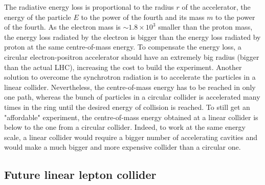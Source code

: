     The radiative energy loss is proportional to the radius $r$ of the accelerator, the energy of the particle $E$ to the power of the fourth and its mass $m$ to the power of the fourth.
    As the electron mass is $\sim 1.8 \times 10^3$ smaller than the proton mass, the energy loss radiated by the electron is bigger than the energy loss radiated by proton at the same centre-of-mass energy.
    To compensate the energy loss, a circular electron-positron accelerator should have an extremely big radius (bigger than the actual \gls{LHC}), increasing the cost to build the experiment.
    Another solution to overcome the synchrotron radiation is to accelerate the particles in a linear collider. Nevertheless, the centre-of-mass energy has to be reached in only one path, whereas the bunch of particles in a circular collider is accelerated many times in the ring until the desired energy of collision is reached.
    To still get an "affordable" experiment, the centre-of-mass energy obtained at a linear collider is below to the one from a circular collider. 
    Indeed, to work at the same energy scale, a linear collider would require a bigger number of accelerating cavities and would make a much bigger and more expensive collider than a circular one.

    \subsection{Future linear lepton collider}

